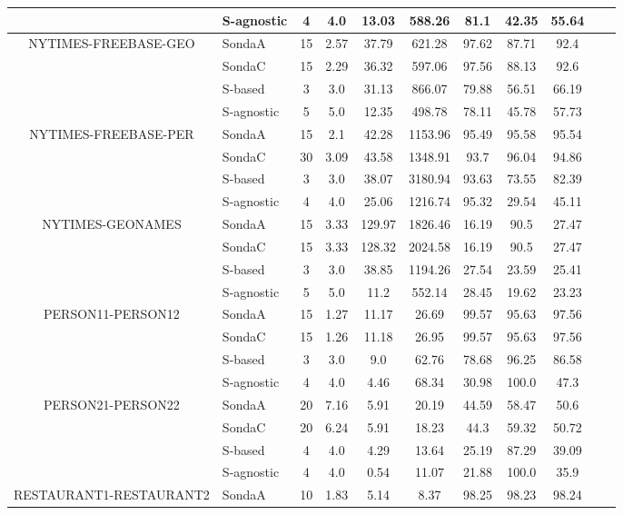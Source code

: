 \begin{center}
\begin{table*}[h]
\begin{tabular}{|c|l|c|c|c|c|c|c|c|c|c|}
 & S-agnostic  & 4 & 4.0   & 13.03  & 588.26 & 81.1 & 42.35 & 55.64  \\ \hline
\multirow{4}{*}{NYTIMES-FREEBASE-GEO}  & SondaA  & 15 & 2.57   & 37.79  & 621.28 & 97.62 & 87.71 & 92.4  \\
 & SondaC  & 15 & 2.29   & 36.32  & 597.06 & 97.56 & 88.13 & 92.6  \\
 & S-based  & 3 & 3.0   & 31.13  & 866.07 & 79.88 & 56.51 & 66.19  \\
 & S-agnostic  & 5 & 5.0   & 12.35  & 498.78 & 78.11 & 45.78 & 57.73  \\ \hline
\multirow{4}{*}{NYTIMES-FREEBASE-PER}  & SondaA  & 15 & 2.1   & 42.28  & 1153.96 & 95.49 & 95.58 & 95.54  \\
 & SondaC  & 30 & 3.09   & 43.58  & 1348.91 & 93.7 & 96.04 & 94.86  \\
 & S-based  & 3 & 3.0   & 38.07  & 3180.94 & 93.63 & 73.55 & 82.39  \\
 & S-agnostic  & 4 & 4.0   & 25.06  & 1216.74 & 95.32 & 29.54 & 45.11  \\ \hline
\multirow{4}{*}{NYTIMES-GEONAMES}  & SondaA  & 15 & 3.33   & 129.97  & 1826.46 & 16.19 & 90.5 & 27.47  \\
 & SondaC  & 15 & 3.33   & 128.32  & 2024.58 & 16.19 & 90.5 & 27.47  \\
 & S-based  & 3 & 3.0   & 38.85  & 1194.26 & 27.54 & 23.59 & 25.41  \\
 & S-agnostic  & 5 & 5.0   & 11.2  & 552.14 & 28.45 & 19.62 & 23.23  \\ \hline
\multirow{4}{*}{PERSON11-PERSON12}  & SondaA  & 15 & 1.27   & 11.17  & 26.69 & 99.57 & 95.63 & 97.56  \\
 & SondaC  & 15 & 1.26   & 11.18  & 26.95 & 99.57 & 95.63 & 97.56  \\
 & S-based  & 3 & 3.0   & 9.0  & 62.76 & 78.68 & 96.25 & 86.58  \\
 & S-agnostic  & 4 & 4.0   & 4.46  & 68.34 & 30.98 & 100.0 & 47.3  \\ \hline
\multirow{4}{*}{PERSON21-PERSON22}  & SondaA  & 20 & 7.16   & 5.91  & 20.19 & 44.59 & 58.47 & 50.6  \\
 & SondaC  & 20 & 6.24   & 5.91  & 18.23 & 44.3 & 59.32 & 50.72  \\
 & S-based  & 4 & 4.0   & 4.29  & 13.64 & 25.19 & 87.29 & 39.09  \\
 & S-agnostic  & 4 & 4.0   & 0.54  & 11.07 & 21.88 & 100.0 & 35.9  \\ \hline
\multirow{4}{*}{RESTAURANT1-RESTAURANT2}  & SondaA  & 10 & 1.83   & 5.14  & 8.37 & 98.25 & 98.23 & 98.24  \\

\end{tabular}
\end{table*}
\end{center}
